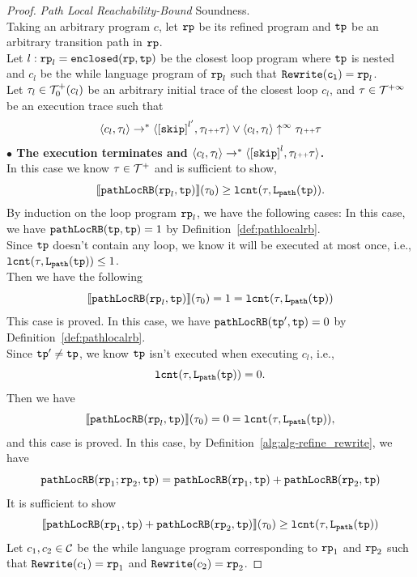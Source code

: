 \begin{proof}
\emph{Path Local Reachability-Bound} Soundness.
\\
Taking an arbitrary program $c$, let $\mathtt{rp}$ be its refined program and $\mathtt{tp}$ be an arbitrary transition path in $\mathtt{rp}$.
\\
Let $l: \mathtt{rp}_l = \mathtt{enclosed}(\mathtt{rp}, \mathtt{tp})$ be the closest loop program where $\mathtt{tp}$ is nested and $c_l$ be the while language program of $\mathtt{rp}_l$ such that $\mathtt{Rewrite(c_l)} = \mathtt{rp}_l$. 
\\
Let $\mathtt{\tau}_l \in \mathcal{T}^{+}_0(c_l)$ be an arbitrary initial trace of the closest loop $c_l$, and $\mathtt{\tau} \in \mathcal{T}^{+\infty} $ be an execution trace such that
\[
  \config{c_l, \trace_l} \to^* \config{\clabel{\eskip}^{l'}, \trace_l \tracecat \trace} \lor \config{c_l, \trace_l} \uparrow^{\infty} \trace_l \tracecat \trace 
\]
\textbf{$\bullet$ The execution terminates and {$\config{{c_l}, \trace_l} \to^{*} \config{\clabel{\eskip}^{l}, \trace_l \tracecat \trace}$}.} 
\\
 In this case we know $\mathtt{\tau} \in \mathcal{T}^{+}$ and is sufficient to show,
\[
  \llbracket \mathtt{pathLocRB}(\mathtt{rp}_l, \mathtt{tp}) \rrbracket(\mathtt{\tau}_0) \geq \mathtt{lcnt}(\mathtt{\tau}, \mathtt{L}_{\mathtt{path}}(\mathtt{tp})).
\]
By induction on the loop program $\mathtt{rp}_l$,
we have the following cases:
In this case, we have $\mathtt{pathLocRB}(\mathtt{tp}, \mathtt{tp}) = 1$ by Definition~\ref{def:pathlocalrb}. 
\\
Since $\mathtt{tp}$ doesn't contain any loop, we know it will be executed at most once,  i.e., $\mathtt{lcnt}(\mathtt{\tau}, \mathtt{L}_{\mathtt{path}}(\mathtt{tp})) \leq 1$.
\\
Then we have the following
\[\llbracket \mathtt{pathLocRB}(\mathtt{rp}_l, \mathtt{tp}) \rrbracket(\mathtt{\tau}_0) = 1 = \mathtt{lcnt}(\mathtt{\tau}, \mathtt{L}_{\mathtt{path}}(\mathtt{tp})) \]
This case is proved.
In this case, we have $\mathtt{pathLocRB}(\mathtt{tp}', \mathtt{tp}) = { 0} $ by Definition~\ref{def:pathlocalrb}.
\\
Since $\mathtt{tp}' \neq \mathtt{tp}$, we know $\mathtt{tp}$ isn't executed when executing $c_l$, i.e., 
$$\mathtt{lcnt}(\mathtt{\tau}, \mathtt{L}_{\mathtt{path}}(\mathtt{tp})) = 0.$$
Then we have
\[
  \llbracket \mathtt{pathLocRB}(\mathtt{rp}_l, \mathtt{tp}) \rrbracket(\mathtt{\tau}_0) = 0 = \mathtt{lcnt}(\mathtt{\tau}, \mathtt{L}_{\mathtt{path}}(\mathtt{tp})),
  \]
and this case is proved.
In this case, by Definition~\ref{alg:alg-refine_rewrite}, we have 
$$\mathtt{pathLocRB}(\mathtt{rp}_1;\mathtt{rp}_2, \mathtt{tp}) = \mathtt{pathLocRB}(\mathtt{rp}_1, \mathtt{tp}) + \mathtt{pathLocRB}(\mathtt{rp}_2, \mathtt{tp}) $$ 
It is sufficient to show
\[
  \llbracket \mathtt{pathLocRB}(\mathtt{rp}_1, \mathtt{tp}) + \mathtt{pathLocRB}(\mathtt{rp}_2, \mathtt{tp}) \rrbracket(\mathtt{\tau}_0) \geq \mathtt{lcnt}(\mathtt{\tau}, \mathtt{L}_{\mathtt{path}}(\mathtt{tp})) 
\]
Let $c_1, c_2 \in \mathcal{C}$ be the while language program corresponding to $\mathtt{rp}_1$ and $\mathtt{rp}_2$ such that $\mathtt{Rewrite}(c_1) = \mathtt{rp}_1$ and $\mathtt{Rewrite}(c_2) = \mathtt{rp}_2$.

\end{proof}
